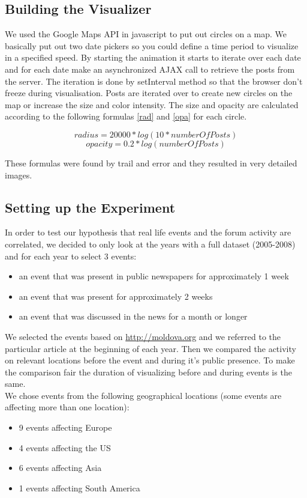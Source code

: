 \documentclass[11pt,a4paper,english]{article}
\begin{document}
		\subsection{Building the Visualizer}
		We used the Google Maps API in javascript to put out circles on a map. We basically put out two date pickers so you could define a time period to visualize in a specified speed. By starting the animation it starts to iterate over each date and for each date make an asynchronized AJAX call to retrieve the posts from the server. The iteration is done by setInterval method so that the browser don't freeze during visualisation. Posts are iterated over to create new circles on the map or increase the size and color intensity. The size and opacity are calculated according to the following formulas \ref{rad} and \ref{opa} for each circle.

		\begin{equation} \label{rad}
			 radius = 20000*log(10* number Of Posts)
		\end{equation}
		\begin{equation} \label{opa}
			 opacity = 0.2*log( number Of Posts )
		\end{equation}

		These formulas were found by trail and error and they resulted in very detailed images.
		
		\subsection{Setting up the Experiment}
		In order to test our hypothesis that real life events and the forum activity are correlated, we decided to only look at the years with a full dataset (2005-2008) and for each year to select 3 events:
		\begin{itemize}
			\item an event that was present in public newspapers for approximately 1 week
			\item an event that was present for approximately 2 weeks
			\item an event that was discussed in the news for a month or longer
		\end{itemize}
		We selected the events based on \url{http://moldova.org} and we referred to the particular article at the beginning of each year. Then we compared the activity on relevant locations before the event and during it's public presence. To make the comparison fair the duration of visualizing before and during events is the same.
		\\ We chose events from the following geographical locations (some events are affecting more than one location):
		\begin{itemize}
			\item 9 events affecting Europe
			\item 4 events affecting the US
			\item 6 events affecting Asia
			\item 1 events affecting South America
		\end{itemize}
\end{document}
